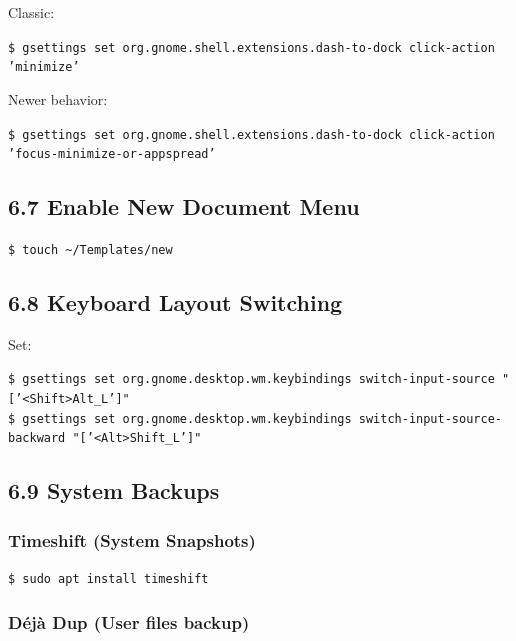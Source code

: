 \documentclass[12pt]{article}
\begin{document}
Classic:

\begin{highlightbox}
\texttt{\$ gsettings set org.gnome.shell.extensions.dash-to-dock click-action 'minimize'}
\end{highlightbox}

Newer behavior:

\begin{highlightbox}
\texttt{\$ gsettings set org.gnome.shell.extensions.dash-to-dock click-action 'focus-minimize-or-appspread'}
\end{highlightbox}

\subsection*{6.7 Enable New Document Menu}

\begin{highlightbox}
\texttt{\$ touch \textasciitilde/Templates/new}
\end{highlightbox}

\subsection*{6.8 Keyboard Layout Switching}

Set:
\begin{highlightbox}
\texttt{\$ gsettings set org.gnome.desktop.wm.keybindings switch-input-source "['<Shift>Alt\_L']"}\\
\texttt{\$ gsettings set org.gnome.desktop.wm.keybindings switch-input-source-backward "['<Alt>Shift\_L']"}
\end{highlightbox}

\subsection*{6.9 System Backups}

\subsubsection*{Timeshift (System Snapshots)}

\begin{highlightbox}
\texttt{\$ sudo apt install timeshift}
\end{highlightbox}

\subsubsection*{Déjà Dup (User files backup)}
\end{document}
